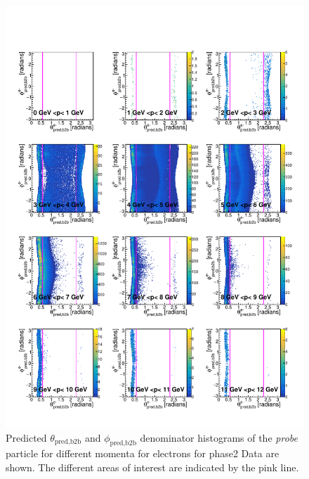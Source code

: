 \documentclass[a4paper,11pt,twosided,final,german,openbib,pdftex,listof=totoc,bibliography=totoc]{scrbook}
\begin{document}
\begin{appendix}
\clearpage





\begin{figure}[h!]
	\includegraphics[width=\textwidth]{Plots/master/RTPMemD_Data.pdf}
	\caption[Denominator $\theta_{\textrm{pred,b2b}}$-$\phi_{\textrm{pred,b2b}}$ Electron Momentum Phase2 Data]{Predicted $\theta_{\textrm{pred,b2b}}$ and $\phi_{\textrm{pred,b2b}}$ denominator histograms of the \textit{probe} particle for different momenta for electrons for phase2 Data are shown. The different areas of interest are indicated by the pink line.}
	\label{plt:RTPMemD_Data}
\end{figure}




\end{appendix}
\end{document}
